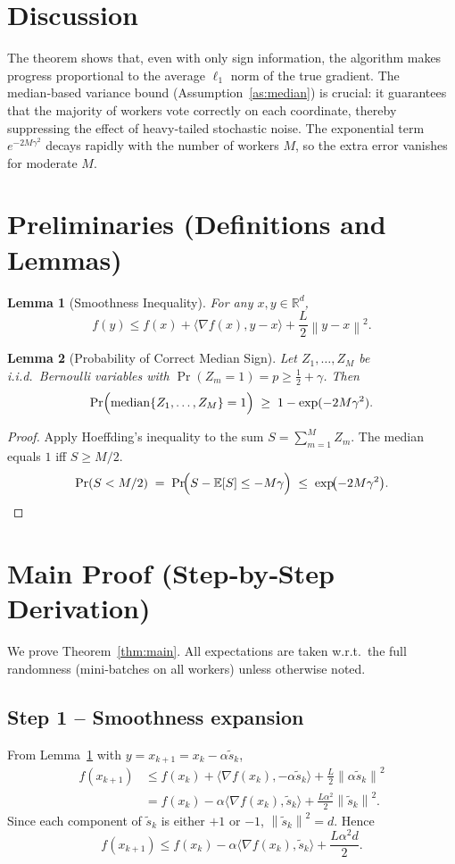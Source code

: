 \documentclass{article}
\newtheorem{lemma}{Lemma}
\newcommand{\E}{\mathbb{E}}
\newcommand{\R}{\mathbb{R}}
\newcommand{\norm}[1]{\left\lVert#1\right\rVert}
\begin{document}
\section*{Discussion}
The theorem shows that, even with only sign information, the algorithm makes
progress proportional to the average $\ell_{1}$ norm of the true gradient.
The median‑based variance bound (Assumption~\ref{as:median}) is crucial:
it guarantees that the majority of workers vote correctly on each coordinate,
thereby suppressing the effect of heavy‑tailed stochastic noise.  The exponential
term $e^{-2M\gamma^{2}}$ decays rapidly with the number of workers $M$, so the
extra error vanishes for moderate $M$.

\newpage
\section*{Preliminaries (Definitions and Lemmas)}
\begin{lemma}[Smoothness Inequality]\label{lem:smooth}
For any $x,y\in\R^{d}$,
\[
f(y)\le f(x)+\langle\nabla f(x),y-x\rangle+\frac{L}{2}\norm{y-x}^{2}.
\]
\end{lemma}
\begin{lemma}[Probability of Correct Median Sign]\label{lem:median}
Let $Z_{1},\dots,Z_{M}$ be i.i.d.\ Bernoulli variables with $\Pr(Z_{m}=1)=p\ge\tfrac12+\gamma$.
Then
\[
\Pr\Bigl(\operatorname{median}\{Z_{1},\dots,Z_{M}\}=1\Bigr)
\;\ge\;1-\exp(-2M\gamma^{2}).
\]
\end{lemma}
\begin{proof}
Apply Hoeffding’s inequality to the sum $S=\sum_{m=1}^{M}Z_{m}$.
The median equals $1$ iff $S\ge M/2$.
\[
\Pr(S<M/2)\;=\;\Pr\!\Bigl(S-\E[S]\le -M\gamma\Bigr)
\;\le\;\exp\!\bigl(-2M\gamma^{2}\bigr).
\]
\end{proof}

\section*{Main Proof (Step‑by‑Step Derivation)}
We prove Theorem~\ref{thm:main}.  All expectations are taken w.r.t.\ the
full randomness (mini‑batches on all workers) unless otherwise noted.

\subsection*{Step 1 – Smoothness expansion}
From Lemma~\ref{lem:smooth} with $y=x_{k+1}=x_{k}-\alpha\tilde{s}_{k}$,
\begin{align}
f(x_{k+1})
&\le f(x_{k})+\big\langle\nabla f(x_{k}), -\alpha\tilde{s}_{k}\big\rangle
   +\frac{L}{2}\norm{\alpha\tilde{s}_{k}}^{2}  \nonumber\\
&= f(x_{k})-\alpha\langle\nabla f(x_{k}),\tilde{s}_{k}\rangle
   +\frac{L\alpha^{2}}{2}\norm{\tilde{s}_{k}}^{2}.
\tag{4}
\end{align}
Since each component of $\tilde{s}_{k}$ is either $+1$ or $-1$, $\norm{\tilde{s}_{k}}^{2}=d$.
Hence
\[
f(x_{k+1})\le f(x_{k})-\alpha\langle\nabla f(x_{k}),\tilde{s}_{k}\rangle
   +\frac{L\alpha^{2}d}{2}.
\tag{5}
\]
\end{document}
